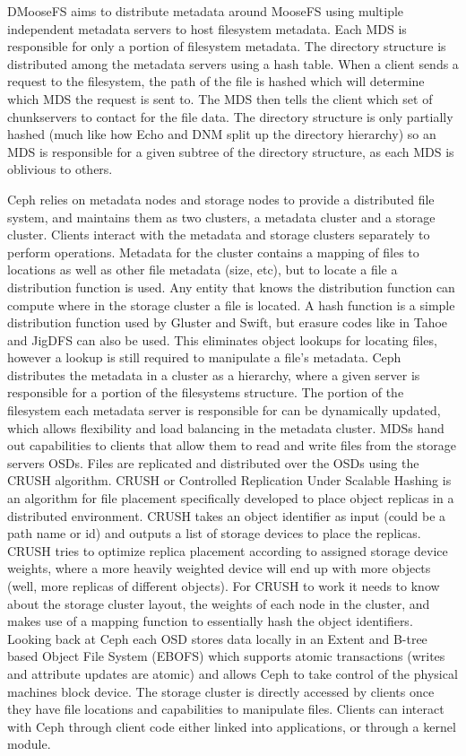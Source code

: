 DMooseFS \cite{Yu2012} aims to distribute metadata around MooseFS using
multiple independent metadata servers to host filesystem metadata. Each MDS is
responsible for only a portion of filesystem metadata. The directory structure
is distributed among the metadata servers using a hash table. When a client
sends a request to the filesystem, the path of the file is hashed which will
determine which MDS the request is sent to. The MDS then tells the client
which set of chunkservers to contact for the file data. The directory
structure is only partially hashed (much like how Echo and DNM split up the
directory hierarchy) so an MDS is responsible for a given subtree of the
directory structure, as each MDS is oblivious to others.


Ceph \cite{Weil2006} relies on metadata nodes and storage nodes to provide a
distributed file system, and maintains them as two clusters, a metadata
cluster and a storage cluster. Clients interact with the metadata and storage
clusters separately to perform operations. Metadata for the cluster contains a
mapping of files to locations as well as other file metadata (size, etc), but
to locate a file a distribution function is used. Any entity that knows the
distribution function can compute where in the storage cluster a file is
located. A hash function is a simple distribution function used by Gluster and
Swift, but erasure codes like in Tahoe and JigDFS can also be used. This
eliminates object lookups for locating files, however a lookup is still
required to manipulate a file's metadata. Ceph distributes the metadata in a
cluster as a hierarchy, where a given server is responsible for a portion of
the filesystems structure. The portion of the filesystem each metadata server
is responsible for can be dynamically updated, which allows flexibility and
load balancing in the metadata cluster. MDSs hand out capabilities to clients
that allow them to read and write files from the storage servers OSDs. Files
are replicated and distributed over the OSDs using the CRUSH algorithm. CRUSH
or Controlled Replication Under Scalable Hashing \cite{Weil2006a} is an
algorithm for file placement specifically developed to place object replicas
in a distributed environment. CRUSH takes an object identifier as input (could
be a path name or id) and outputs a list of storage devices to place the
replicas. CRUSH tries to optimize replica placement according to assigned
storage device weights, where a more heavily weighted device will end up with
more objects (well, more replicas of different objects). For CRUSH to work it
needs to know about the storage cluster layout, the weights of each node in
the cluster, and makes use of a mapping function to essentially hash the
object identifiers. Looking back at Ceph each OSD stores data locally in an
Extent and B-tree based Object File System (EBOFS) which supports atomic
transactions (writes and attribute updates are atomic) and allows Ceph to take
control of the physical machines block device. The storage cluster is directly
accessed by clients once they have file locations and capabilities to
manipulate files. Clients can interact with Ceph through client code either
linked into applications, or through a kernel module.


